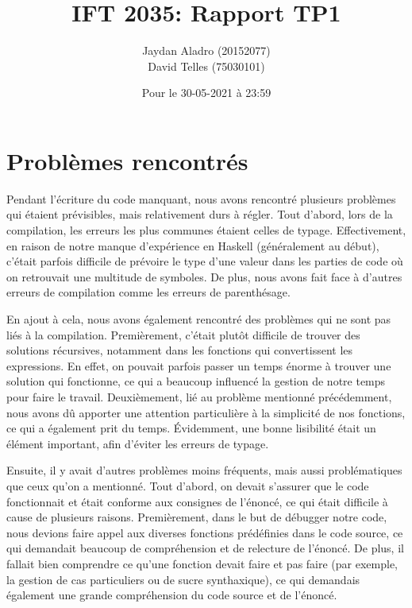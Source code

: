\documentclass[11pt]{article}
\title{ IFT 2035: Rapport TP1}
\author{ Jaydan Aladro (20152077)\\
         David Telles (75030101)}
\date{ Pour le 30-05-2021 à 23:59}
\begin{document}
\maketitle	
\pagebreak


\section{Problèmes rencontrés}

\par Pendant l'écriture du code manquant, nous avons rencontré plusieurs problèmes qui étaient prévisibles, mais relativement durs à régler. Tout d'abord, lors de la compilation, les erreurs les plus communes étaient celles de typage. Effectivement, en raison de notre manque d'expérience en Haskell (généralement au début), c'était parfois difficile de prévoire le type d'une valeur dans les parties de code où on retrouvait une multitude de symboles. De plus, nous avons fait face à d'autres erreurs de compilation comme les erreurs de parenthésage.

\par En ajout à cela, nous avons également rencontré des problèmes qui ne sont pas liés à la compilation. Premièrement, c'était plutôt difficile de trouver des solutions récursives, notamment dans les fonctions qui convertissent les expressions. En effet, on pouvait parfois passer un temps énorme à trouver une solution qui fonctionne, ce qui a beaucoup influencé la gestion de notre temps pour faire le travail. Deuxièmement, lié au problème mentionné précédemment, nous avons dû apporter une attention particulière à la simplicité de nos fonctions, ce qui a également prit du temps. Évidemment, une bonne lisibilité était un élément important, afin d'éviter les erreurs de typage.

\par Ensuite, il y avait d'autres problèmes moins fréquents, mais aussi problématiques que ceux qu'on a mentionné. Tout d'abord, on devait s'assurer que le code fonctionnait et était conforme aux consignes de l'énoncé, ce qui était difficile à cause de plusieurs raisons. Premièrement, dans le but de débugger notre code, nous devions faire appel aux diverses fonctions prédéfinies dans le code source, ce qui demandait beaucoup de compréhension et de relecture de l'énoncé. De plus, il fallait bien comprendre ce qu'une fonction devait faire et pas faire (par exemple, la gestion de cas particuliers ou de sucre synthaxique), ce qui demandais également une grande compréhension du code source et de l'énoncé. 
\end{document}
